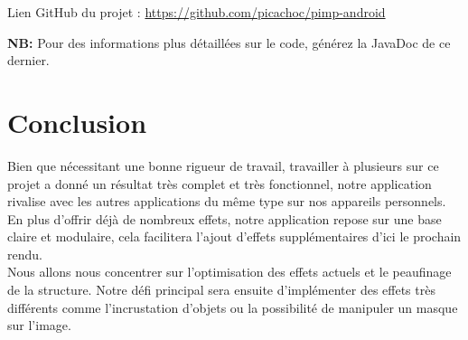 \documentclass[12pt, a4paper]{article}
\begin{document}
\vspace{1cm}
\faArrowRight Lien GitHub du projet :
\href{https://github.com/picachoc/pimp-android}{https://github.com/picachoc/pimp-android}
\vspace{0.5cm}

\textbf{NB: } Pour des informations plus détaillées sur le code, générez la JavaDoc de ce dernier.

\clearpage


\clearpage


\clearpage


\clearpage


\clearpage


\clearpage


\clearpage

\section{Conclusion}
Bien que nécessitant une bonne rigueur de travail, travailler à plusieurs sur ce projet a donné un résultat très complet et très fonctionnel, notre application rivalise avec les autres applications du même type sur nos appareils personnels.
\\
En plus d'offrir déjà de nombreux effets, notre application repose sur une base claire et modulaire, cela facilitera l'ajout d'effets supplémentaires d'ici le prochain rendu. 
\\
Nous allons nous concentrer sur l'optimisation des effets actuels et le peaufinage de la structure. Notre défi principal sera ensuite d'implémenter des effets très différents comme l'incrustation d'objets ou la possibilité de manipuler un masque sur l'image.
\end{document}
